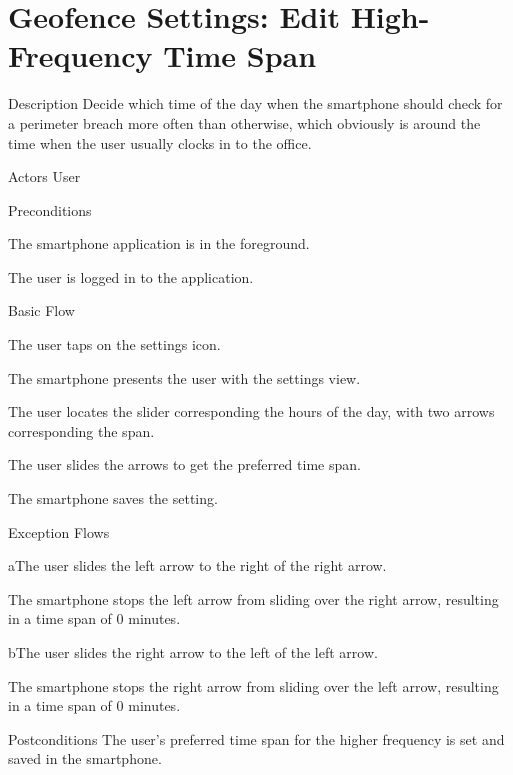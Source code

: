 \section{Geofence Settings: Edit High-Frequency Time Span}

%
\begin{cpart}{Description}
Decide which time of the day when the smartphone should check for a perimeter breach more often than otherwise, which obviously is around the time when the user usually clocks in to the office.
\end{cpart}


%
\begin{cpart}{Actors}
User
\end{cpart}

%
\begin{cpartList}{Preconditions}
\item The smartphone application is in the foreground.
\item The user is logged in to the application.
\end{cpartList}

%
\begin{cpartList}{Basic Flow}
  \item The user taps on the settings icon.
  \item The smartphone presents the user with the settings view.
  \item The user locates the slider corresponding the hours of the day, with two arrows corresponding the span.
  \item The user slides the arrows to get the preferred time span.
  \item The smartphone saves the setting.
\end{cpartList}

%
\begin{cpartList}{Exception Flows}
  \begin{innerList}{4}{a}{The user slides the left arrow to the right of the right arrow.}
    \item The smartphone stops the left arrow from sliding over the right arrow, resulting in a time span of 0 minutes.
  \end{innerList}
  \begin{innerList}{4}{b}{The user slides the right arrow to the left of the left arrow.}
    \item The smartphone stops the right arrow from sliding over the left arrow, resulting in a time span of 0 minutes.
  \end{innerList}
\end{cpartList}

%
\begin{cpart}{Postconditions}
The user's preferred time span for the higher frequency is set and saved in the smartphone.
\end{cpart}

\clearpage

